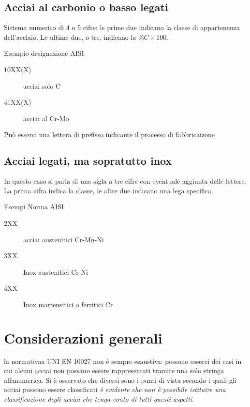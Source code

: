\subsection{Acciai al carbonio o basso legati}
Sistema numerico di 4 o 5 cifre: le prime due indicano la classe di appartenenza dell'acciaio. Le ultime due, o tre, indicano la $\%C \times 100$.

\begin{example}{Esempio designazione \ac{AISI}}
\begin{description}
\item[10XX(X)] acciai solo C
\item[41XX(X)] acciai al Cr-Mo
\end{description}
\end{example}

Può esserci una lettera di prefisso indicante il processo di fabbricaizone

\subsection{Acciai legati, ma sopratutto inox}
In questo caso si parla di una sigla a tre cifre con eventuale aggiunta delle lettere.
La prima cifra indica la classe, le altre due indicano una lega specifica.

\begin{example}{Esempi Norma AISI}
\begin{description}
\item[2XX] acciai austenitici Cr-Mn-Ni
\item[3XX] Inox austenitici Cr-Ni
\item[4XX] Inox martensitici o ferritici Cr
\end{description}
\end{example}

\section{Considerazioni generali}
la normativaa UNI EN 10027 non è sempre esaustiva: possono esserci dei casi in cui alcuni acciai non possano essere rappresentati tramite una solo stringa alfanumerica.
Si è osservato che diversi sono i punti di vista secondo i quali gli acciai possono essere classificati \emph{è evidente che non è possibile istituire una classificazione degli acciai che tenga conto di tutti questi aspetti}.


